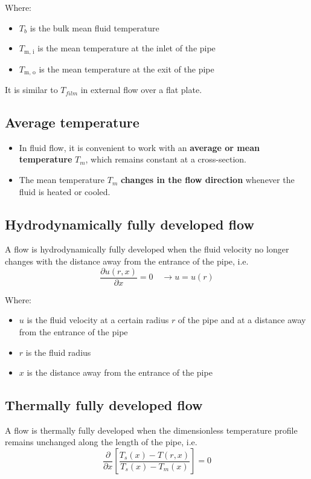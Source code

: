 \documentclass[11pt]{article}
\begin{document}
Where:
\begin{itemize}
\item \(T_b\) is the bulk mean fluid temperature
\item \(T_{\text{m, i}}\) is the mean temperature at the inlet of the pipe
\item \(T_{\text{m, o}}\) is the mean temperature at the exit of the pipe
\end{itemize}

It is similar to \(T_{film}\) in external flow over a flat plate.
\subsection{Average temperature}
\label{sec:orgd12929a}
\begin{itemize}
\item In fluid flow, it is convenient to work with an \textbf{average or mean temperature} \(T_m\), which remains constant at a cross-section.
\item The mean temperature \(T_m\) \textbf{changes in the flow direction} whenever the fluid is heated or cooled.
\end{itemize}
\subsection{Hydrodynamically fully developed flow}
\label{sec:org20f0a08}
A flow is hydrodynamically fully developed when the fluid velocity no longer changes with the distance away from the entrance of the pipe, i.e.
\[\frac{\partial u(r, x)}{\partial x} = 0 \quad \rightarrow u = u(r)\]

Where:
\begin{itemize}
\item \(u\) is the fluid velocity at a certain radius \(r\) of the pipe and at a distance away from the entrance of the pipe
\item \(r\) is the fluid radius
\item \(x\) is the distance away from the entrance of the pipe
\end{itemize}
\subsection{Thermally fully developed flow}
\label{sec:org669c250}
A flow is thermally fully developed when the dimensionless temperature profile remains unchanged along the length of the pipe, i.e.
\[\frac{\partial}{\partial x} \left[\frac{T_s (x) - T(r, x)}{T_s (x) - T_m (x)} \right] = 0\]
\end{document}
